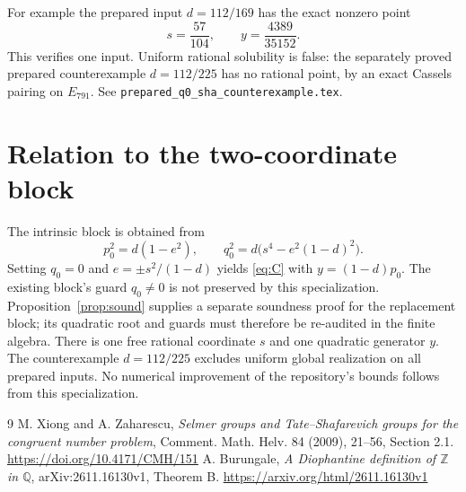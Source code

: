 \documentclass[11pt]{article}
\begin{document}
For example the prepared input $d=112/169$ has the exact nonzero point
\[
 s=\frac{57}{104},\qquad y=\frac{4389}{35152}.
\]
This verifies one input. Uniform rational solubility is false: the separately proved prepared counterexample $d=112/225$ has no rational point, by an exact Cassels pairing on $E_{791}$. See \texttt{prepared\_q0\_sha\_counterexample.tex}.

\section{Relation to the two-coordinate block}
The intrinsic block is obtained from
\[
 p_0^2=d(1-e^2),\qquad
 q_0^2=d\bigl(s^4-e^2(1-d)^2\bigr).
\]
Setting $q_0=0$ and $e=\pm s^2/(1-d)$ yields \eqref{eq:C} with $y=(1-d)p_0$. The existing block's guard $q_0\ne0$ is not preserved by this specialization. Proposition~\ref{prop:sound} supplies a separate soundness proof for the replacement block; its quadratic root and guards must therefore be re-audited in the finite algebra. There is one free rational coordinate $s$ and one quadratic generator $y$. The counterexample $d=112/225$ excludes uniform global realization on all prepared inputs. No numerical improvement of the repository's bounds follows from this specialization.

\begin{thebibliography}{9}
 M. Xiong and A. Zaharescu, \emph{Selmer groups and Tate--Shafarevich groups for the congruent number problem}, Comment. Math. Helv. 84 (2009), 21--56, Section 2.1. \url{https://doi.org/10.4171/CMH/151}
 A. Burungale, \emph{A Diophantine definition of $\mathbb Z$ in $\mathbb Q$}, arXiv:2611.16130v1, Theorem B. \url{https://arxiv.org/html/2611.16130v1}
\end{thebibliography}
\end{document}
